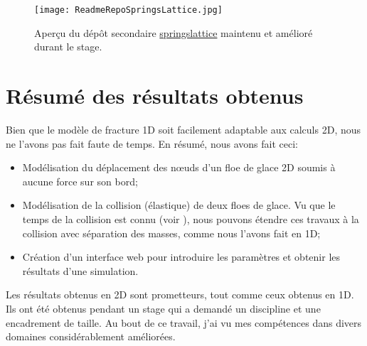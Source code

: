 \begin{figure}[!h]
    \centering
    \texttt{[image: ReadmeRepoSpringsLattice.jpg]}
    \caption{Aperçu du dépôt secondaire \href{https://framagit.org/RaK/SimuRessorts/-/tree/master}{springslattice} maintenu et amélioré durant le stage.}
    \label{fig:readme2d}
\end{figure}



\section{Résumé des résultats obtenus}

Bien que le modèle de fracture 1D soit facilement adaptable aux calculs 2D, nous ne l'avons pas fait faute de temps. En résumé, nous avons fait ceci:
\begin{itemize}
    \item Modélisation du déplacement des n\oe{}uds d'un floe de glace 2D soumis à aucune force sur son bord;
    \item Modélisation de la collision (élastique) de deux floes de glace. Vu que le temps de la collision est connu (voir \parencite{rabatel2015thesis}), nous pouvons étendre ces travaux à la collision avec séparation des masses, comme nous l'avons fait en 1D;
    \item Création d'un interface web pour introduire les paramètres et obtenir les résultats d'une simulation. 
\end{itemize}

Les résultats obtenus en 2D sont prometteurs, tout comme ceux obtenus en 1D. Ils ont été obtenus pendant un stage qui a demandé un discipline et une encadrement de taille. Au bout de ce travail, j'ai vu mes compétences dans divers domaines considérablement améliorées.
